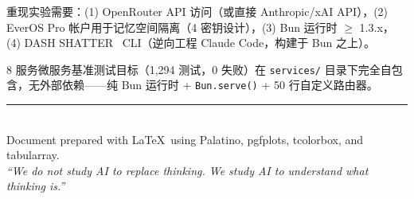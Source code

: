 \documentclass[11pt, a4paper]{article}
\begin{document}
重现实验需要：(1) OpenRouter API 访问（或直接 Anthropic/xAI API），(2) EverOS Pro 帐户用于记忆空间隔离（4 密钥设计），(3) Bun 运行时 $\geq$ 1.3.x，(4) DASH SHATTER~\cite{zhu2026dashshatter} CLI（逆向工程 Claude Code，构建于 Bun 之上）。

8 服务微服务基准测试目标（1{,}294 测试，0 失败）在 \texttt{services/} 目录下完全自包含，无外部依赖——纯 Bun 运行时 + \texttt{Bun.serve()} + 50 行自定义路由器。




\vfill

\begin{center}
{\color{accent}\rule{0.5\textwidth}{0.5pt}}\\[8pt]
{\small\sffamily\color{faded} Document prepared with \LaTeX\ using Palatino, pgfplots, tcolorbox, and tabularray.\\[4pt]
\textit{``We do not study AI to replace thinking. We study AI to understand what thinking is.''}}
\end{center}
\end{document}
